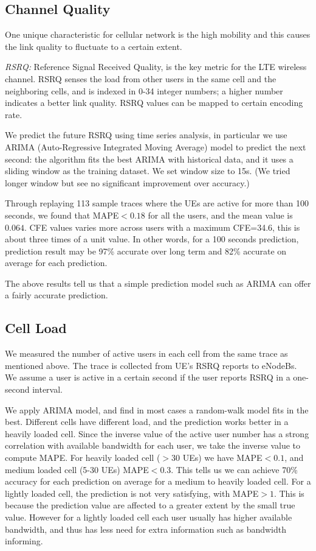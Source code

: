 \subsection{Channel Quality}\label{subsec:CQ}
One unique characteristic for cellular network is the high mobility and this causes the link quality to fluctuate to a certain extent.

\emph{RSRQ:} Reference Signal Received Quality, is the key metric for the LTE wireless channel. RSRQ senses the load from other users in the same cell and the neighboring cells, and is indexed in 0-34 integer numbers; a higher number indicates a better link quality. RSRQ values can be mapped to certain encoding rate.

We predict the future RSRQ using time series analysis, in particular we use ARIMA (Auto-Regressive Integrated Moving Average) model to predict the next second: the algorithm fits the best ARIMA with historical data, and it uses a sliding window as the training dataset. We set window size to 15s. (We tried longer window but see no significant improvement over accuracy.) 

Through replaying 113 sample traces where the UEs are active for more than 100 seconds, we found that MAPE$<0.18$ for all the users, and the mean value is $0.064$. CFE values varies more across users with a maximum CFE=34.6, this is about three times of a unit value. In other words, for a 100 seconds prediction, prediction result may be 97\% accurate over long term and 82\% accurate on average for each prediction. 

The above results tell us that a simple prediction model such as ARIMA can offer a fairly accurate prediction. 

\subsection{Cell Load}\label{subsec:NUser}
We measured the number of active users in each cell from the same trace as mentioned above. The trace is collected from UE's RSRQ reports to eNodeBs. We assume a user is active in a certain second if the user reports RSRQ in a one-second interval. 

We apply ARIMA model, and find in most cases a random-walk model fits in the best. Different cells have different load, and the prediction works better in a heavily loaded cell. Since the inverse value of the active user number has a strong correlation with available bandwidth for each user, we take the inverse value to compute MAPE. For heavily loaded cell ($>30$ UEs) we have MAPE$<0.1$, and medium loaded cell (5-30 UEs) MAPE$<0.3$. This tells us we can achieve 70\% accuracy for each prediction on average for a medium to heavily loaded cell. For a lightly loaded cell, the prediction is not very satisfying, with MAPE$>1$. This is because the prediction value are affected to a greater extent by the small true value. However for a lightly loaded cell each user usually has higher available bandwidth, and thus has less need for extra information such as bandwidth informing.  

